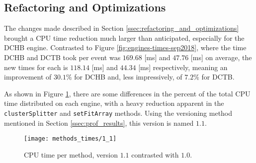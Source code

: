 \subsection{Refactoring and Optimizations} \label{ssec:val_refactoring_and_optimizations}
The changes made described in Section \ref{ssec:refactoring_and_optimizations} brought a CPU time reduction much larger than anticipated, especially for the DCHB engine.
Contrasted to Figure \ref{fig:engines-times-sep2018}, where the time DCHB and DCTB took per event was $169.68$ [ms] and $47.76$ [ms] on average, the new times for each is $118.14$ [ms] and $44.34$ [ms] respectively, meaning an improvement of $30.1\%$ for DCHB and, less impressively, of $7.2\%$ for DCTB.

As shown in Figure \ref{fig:methods_times-1_1}, there are some differences in the percent of the total CPU time distributed on each engine, with a heavy reduction apparent in the \texttt{clusterSplitter} and \texttt{setFitArray} methods.
Using the versioning method mentioned in Section \ref{ssec:prof_results}, this version is named $1.1$.

    \begin{figure}[ht]
        \centering
        \texttt{[image: methods\_times/1\_1]}
        \caption{\label{fig:methods_times-1_1} CPU time per method, version $1.1$ contrasted with $1.0$.}
    \end{figure}

